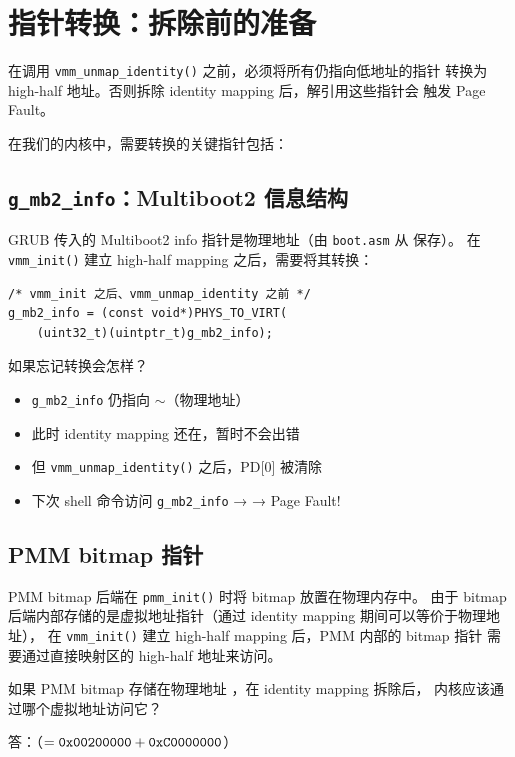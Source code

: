 \section{指针转换：拆除前的准备}

\begin{warnbox}
在调用 \texttt{vmm\_unmap\_identity()} 之前，必须将所有仍指向低地址的指针
转换为 high-half 地址。否则拆除 identity mapping 后，解引用这些指针会
触发 Page Fault。
\end{warnbox}

在我们的内核中，需要转换的关键指针包括：

\subsection{\texttt{g\_mb2\_info}：Multiboot2 信息结构}

GRUB 传入的 Multiboot2 info 指针是物理地址（由 \texttt{boot.asm} 从  保存）。
在 \texttt{vmm\_init()} 建立 high-half mapping 之后，需要将其转换：

\begin{lstlisting}[style=cstyle, caption={kmain.c：转换 Multiboot2 指针}]
/* vmm_init 之后、vmm_unmap_identity 之前 */
g_mb2_info = (const void*)PHYS_TO_VIRT(
    (uint32_t)(uintptr_t)g_mb2_info);
\end{lstlisting}

如果忘记转换会怎样？
\begin{itemize}
  \item \texttt{g\_mb2\_info} 仍指向 $\sim$（物理地址）
  \item 此时 identity mapping 还在，暂时不会出错
  \item 但 \texttt{vmm\_unmap\_identity()} 之后，PD[0] 被清除
  \item 下次 shell 命令访问 \texttt{g\_mb2\_info} →  → Page Fault!
\end{itemize}

\subsection{PMM bitmap 指针}

PMM bitmap 后端在 \texttt{pmm\_init()} 时将 bitmap 放置在物理内存中。
由于 bitmap 后端内部存储的是虚拟地址指针（通过 identity mapping 期间可以等价于物理地址），
在 \texttt{vmm\_init()} 建立 high-half mapping 后，PMM 内部的 bitmap 指针
需要通过直接映射区的 high-half 地址来访问。

\begin{thinkbox}
如果 PMM bitmap 存储在物理地址 ，在 identity mapping 拆除后，
内核应该通过哪个虚拟地址访问它？

答：（$= \texttt{0x00200000} + \texttt{0xC0000000}$）
\end{thinkbox}


